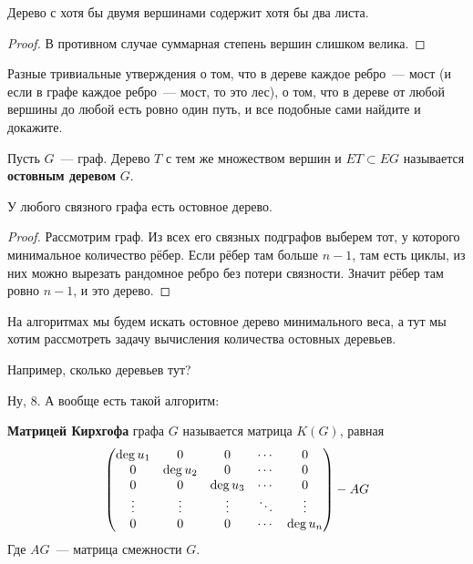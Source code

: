 \documentclass{article}
\begin{document}
    \begin{lemma}
        Дерево с хотя бы двумя вершинами содержит хотя бы два листа.
    \end{lemma}
    \begin{proof}
        В противном случае суммарная степень вершин слишком велика.
    \end{proof}
    \begin{claim}
        Разные тривиальные утверждения о том, что в дереве каждое ребро~--- мост (и если в графе каждое ребро~--- мост, то это лес), о том, что в дереве от любой вершины до любой есть ровно один путь, и все подобные сами найдите и докажите.
    \end{claim}
    \begin{definition}
        Пусть $G$~--- граф. Дерево $T$ с тем же множеством вершин и $ET\subset EG$ называется \textbf{остовным деревом} $G$.
    \end{definition}
    \begin{lemma}
        У любого связного графа есть остовное дерево.
    \end{lemma}
    \begin{proof}
        Рассмотрим граф. Из всех его связных подграфов выберем тот, у которого минимальное количество рёбер. Если рёбер там больше $n-1$, там есть циклы, из них можно вырезать рандомное ребро без потери связности. Значит рёбер там ровно $n-1$, и это дерево.
    \end{proof}
    \begin{remark}
        На алгоритмах мы будем искать остовное дерево минимального веса, а тут мы хотим рассмотреть задачу вычисления количества остовных деревьев.
    \end{remark}
    \begin{example}
        Например, сколько деревьев тут?
        \begin{figure}[H]
        \end{figure}\noindent
        Ну, 8. А вообще есть такой алгоритм:
    \end{example}
    \begin{definition}
        \textbf{Матрицей Кирхгофа} графа $G$ называется матрица $K(G)$, равная
        $$
        \left(\begin{matrix}
            \deg u_1 & 0 & 0 & \cdots & 0\\
            0 & \deg u_2 & 0 & \cdots & 0\\
            0 & 0 & \deg u_3 & \cdots & 0\\
            \vdots & \vdots & \vdots & \ddots & \vdots\\
            0 & 0 & 0 & \cdots & \deg u_n\\
        \end{matrix}\right)-AG
        $$
        Где $AG$~--- матрица смежности $G$.
    \end{definition}
\end{document}
